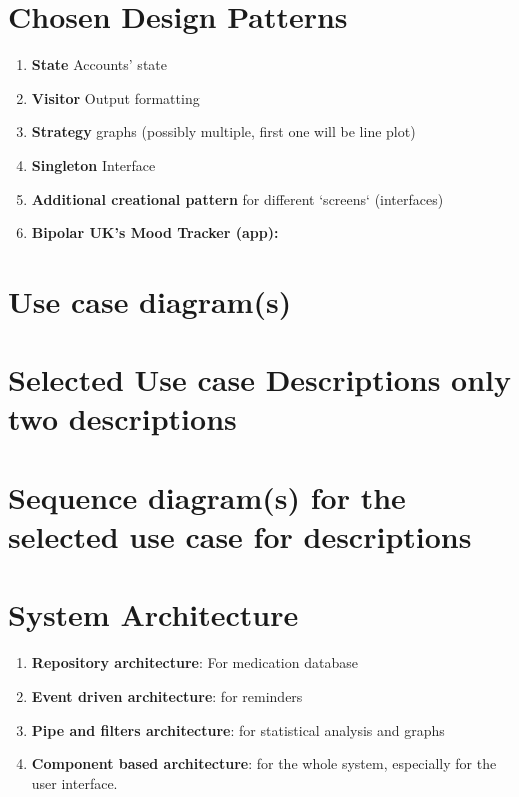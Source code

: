 \documentclass[11pt]{article}
\begin{document}
    \section{Chosen Design Patterns}\label{sec:chosen-design-patterns}

    \begin{enumerate}
        \item \textbf{State} Accounts' state\cite{RefactoringGuru}
        \item \textbf{Visitor} Output formatting\cite{RefactoringGuru}
        \item \textbf{Strategy} graphs (possibly multiple, first one will be line plot)\cite{RefactoringGuru} %
        \item \textbf{Singleton} Interface\cite{RefactoringGuru}
        \item \textbf{Additional creational pattern} for different `screens` (interfaces)\cite{RefactoringGuru}
        \item \textbf{Bipolar UK’s Mood Tracker (app):} \cite{BiPolUK}
    \end{enumerate}


    \section{Use case diagram(s)}\label{sec:use-case-diagram(s)}


    \section{Selected Use case Descriptions {only two descriptions}}\label{sec:selected-use-case-descriptions}


    \section{Sequence diagram(s) {for the selected use case for descriptions}}\label{sec:sequence-diagram(s)}


    \section{System Architecture}\label{sec:system-architecture}

    \begin{enumerate}
        \item \textbf{Repository architecture}: For medication database
        \item \textbf{Event driven architecture}: for reminders
        \item \textbf{Pipe and filters architecture}: for statistical analysis and graphs
        \item \textbf{Component based architecture}: for the whole system, especially for the user interface.
    \end{enumerate}
\end{document}
